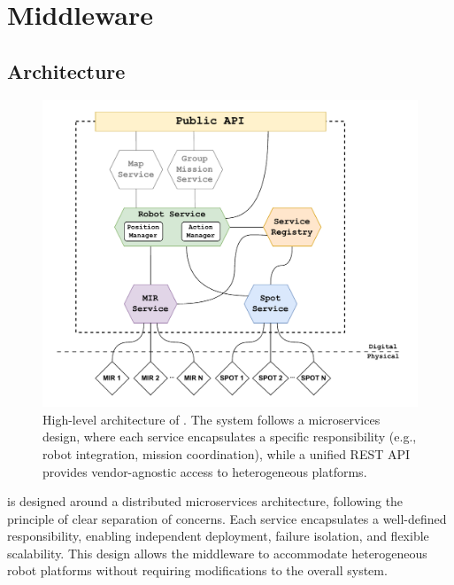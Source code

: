 \documentclass[conference]{IEEEtran}
\begin{document}
\section{\approach{} Middleware}\label{sec:arc}
\subsection{Architecture}

\begin{figure}[htb]
    \centering
    \includegraphics[width=1\columnwidth]{images/arc.pdf}
    \caption{
        High-level architecture of \approach{}. 
        The system follows a microservices design, 
        where each service encapsulates a specific responsibility (e.g., robot integration, mission coordination),
        while a unified REST API provides vendor-agnostic access to heterogeneous platforms.
    }
    \label{fig:arc}
\end{figure}

\approach{} is designed around a distributed microservices architecture, 
 following the principle of clear separation of concerns. 
% 
Each service encapsulates a well-defined responsibility, 
 enabling independent deployment, failure isolation, and flexible scalability. 
% 
This design allows the middleware to accommodate heterogeneous robot platforms 
 without requiring modifications to the overall system.
\end{document}
